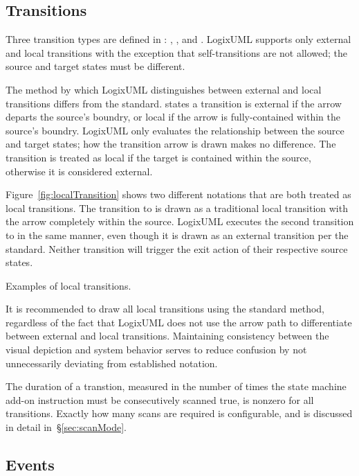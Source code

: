 \subsection{Transitions}

Three transition types are defined in \textcite[\S14.2.3.8.1]{OMGUML}:
, ,
and . LogixUML supports only external and local
transitions with the exception that self-transitions are not allowed; the
source and target states must be different.

The method by which LogixUML distinguishes between external and local
transitions differs from the standard. \textcite[\S14.2.4.9]{OMGUML}
states a transition is external if the arrow departs the source's
boundry, or local if the arrow is fully-contained within the source's boundry.
LogixUML only evaluates the relationship between the source and target states;
how the transition arrow is drawn makes no difference. The transition is
treated as local if the target is contained within the source, otherwise
it is considered external.

Figure~\ref{fig:localTransition} shows two different notations that are both
treated as local transitions. The transition to  is drawn
as a traditional local transition with the arrow completely within the
source. LogixUML executes the second transition to  in the
same manner, even though it is drawn as an external transition per the
standard. Neither transition will trigger the exit action of their
respective source states.

               {Examples of local transitions.}

It is recommended to draw all local transitions using the standard method,
regardless of the fact that LogixUML does not use the arrow path
to differentiate between external and local transitions. Maintaining
consistency between the visual depiction and system behavior serves to
reduce confusion by not unnecessarily deviating from established
notation.

The duration of a transtion, measured in the number of times the state machine
add-on instruction must be consecutively scanned true, is nonzero for all
transitions. Exactly how many scans are required is configurable,
and is discussed in detail in~\S\ref{sec:scanMode}.


\subsection{Events}

